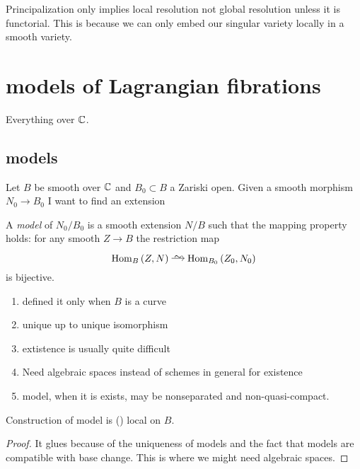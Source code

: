 \documentclass[12pt]{article}
\begin{document}
\begin{rmk}
Principalization only implies local resolution not global resolution unless it is functorial. This is because we can only embed our singular variety locally in a smooth variety. 
\end{rmk}

\section{\Neron models of Lagrangian fibrations}

Everything over $\mathbb{C}$. 

\subsection{\Neron models}

Let $B$ be smooth over $\mathbb{C}$ and $B_0 \subset B$ a Zariski open. Given a smooth morphism $N_0 \to B_0$ I want to find an extension
\begin{center}
\end{center}
A \textit{\Neron model} of $N_0 / B_0$ is a smooth extension $N / B$ such that the \Neron mapping property holds: for any smooth $Z \to B$ the restriction map
\[ \Hom{B}{Z}{N} \iso \Hom{B_0}{Z_0}{N_0} \]
is bijective. 

\begin{rmk}
\begin{enumerate}
\item \Neron defined it only when $B$ is a curve
\item unique up to unique isomorphism
\item extistence is usually quite difficult 
\item Need algebraic spaces instead of schemes in general for existence
\item \Neron model, when it is exists, may be nonseparated and non-quasi-compact.
\end{enumerate}
\end{rmk}

\begin{prop}
Construction of \Neron model is (\etale) local on $B$.
\end{prop}

\begin{proof}
It glues because of the uniqueness of \Neron models and the fact that \Neron models are compatible with \etale base change. This is where we might need algebraic spaces.
\end{proof}
\end{document}
